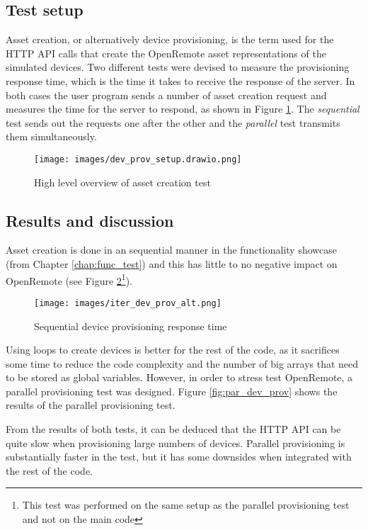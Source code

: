 \subsection{Test setup}
Asset creation, or alternatively device provisioning, is the term used for the HTTP API calls that create the OpenRemote asset representations of the simulated devices. Two different tests were devised to measure the provisioning response time, which is the time it takes to receive the response of the server. In both cases the user program sends a number of asset creation request and measures the time for the server to respond, as shown in Figure \ref{fig:dev_prov_setup}. The \textit{sequential} test sends out the requests one after the other and the \textit{parallel} test transmits them simultaneously.

\begin{figure}[ht]
    \centering
    \texttt{[image: images/dev\_prov\_setup.drawio.png]}
    \caption{High level overview of asset creation test}
    \label{fig:dev_prov_setup}
\end{figure}

\subsection{Results and discussion}
Asset creation is done in an sequential manner in the functionality showcase (from Chapter \ref{chap:func_test}) and this has little to no negative impact on OpenRemote (see Figure \ref{fig:iter_dev_prov}\footnote{This test was performed on the same setup as the parallel provisioning test and not on the main code}).

\begin{figure}[ht]
    \centering
    \texttt{[image: images/iter\_dev\_prov\_alt.png]}
    \caption{Sequential device provisioning response time}
    \label{fig:iter_dev_prov}
\end{figure}

Using loops to create devices is better for the rest of the code, as it sacrifices some time to reduce the code complexity and the number of big arrays that need to be stored as global variables. However, in order to stress test OpenRemote, a parallel provisioning test was designed. Figure \ref{fig:par_dev_prov} shows the results of the parallel provisioning test. 

From the results of both tests, it can be deduced that the HTTP API can be quite slow when provisioning large numbers of devices. Parallel provisioning is substantially faster in the test, but it has some downsides when integrated with the rest of the code.

